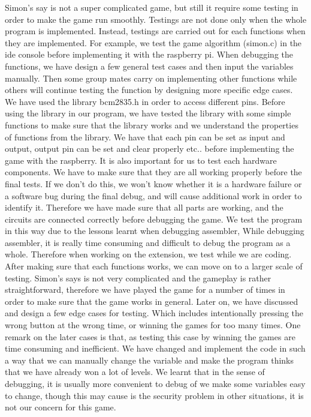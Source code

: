 \documentclass[11pt]{article}
\begin{document}
Simon’s say is not a super complicated game, but still it require some testing in order to make the game run smoothly.\newline\newline
Testings are not done only when the whole program is implemented. Instead, testings are carried out for each functions when they are implemented. For example, we test the game algorithm (simon.c) in the ide console before implementing it with the raspberry pi.\newline \newline
When debugging the functions, we have design a few general test cases and then input the variables manually. Then some group mates carry on implementing other functions while others will continue testing the function by designing more specific edge cases.\newline \newline
We have used the library bcm2835.h in order to access different pins. Before using the library in our program, we have tested the library with some simple functions to make sure that the library works and we understand the properties of functions from the library. We have that each pin can be set as input and output, output pin can be set and clear properly etc.. before implementing the game with the raspberry.\newline \newline
It is also important for us to test each hardware components. We have to make sure that they are all working properly before the final tests. If we don't do this, we won't know whether it is a hardware failure or a software bug during the final debug, and will cause additional work in order to identify it. Therefore we have made sure that all parts are working, and the circuits are connected correctly before debugging the game.\newline \newline
We test the program in this way due to the lessons learnt when debugging assembler, While debugging assembler, it is really time consuming and difficult to debug the program as a whole. Therefore when working on the extension, we test while we are coding.\newline \newline
After making sure that each functions works, we can move on to a larger scale of testing. Simon’s says is not very complicated and the gameplay is rather straightforward, therefore we have played the game for a number of times in order to make sure that the game works in general.\newline 
Later on, we have discussed and design a few edge cases for testing. Which includes intentionally pressing the wrong button at the wrong time, or winning the games for too many times. One remark on the later cases is that, as testing this case by winning the games are time consuming and inefficient. We have changed and implement the code in such a way that we can manually change the variable and make the program thinks that we have already won a lot of levels. We learnt that in the sense of debugging, it is usually more convenient to debug of we make some variables easy to change, though this may cause is the security problem in other situations, it is not our concern for this game.
\end{document}
